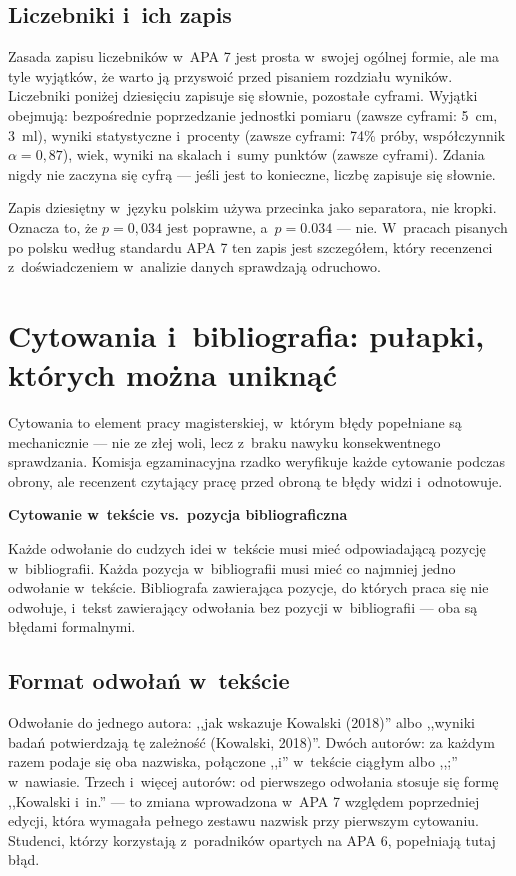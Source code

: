 \documentclass[12pt,a4paper,twoside,openany]{book}
\let\bforigsection\section
\renewcommand{\section}{\needspace{4\baselineskip}\bforigsection}
\newcommand{\concept}[2]{%
  \par\vspace{6pt}
  \begin{tcolorbox}[enhanced, breakable, colback=accent!6, colframe=accent,
    boxrule=0pt, leftrule=3.5pt, arc=2pt, drop fuzzy shadow={black!15},
    left=10pt, right=10pt, top=7pt, bottom=7pt, before upper={\parindent0pt}]
    {\sffamily\bfseries\color{accent}#1}\par\vspace{2pt}\small #2
  \end{tcolorbox}\par
}
\begin{document}
\subsection{Liczebniki i~ich zapis}

Zasada zapisu liczebników w~APA 7 jest prosta w~swojej ogólnej formie, ale ma tyle wyjątków, że warto ją przyswoić przed pisaniem rozdziału wyników. Liczebniki poniżej dziesięciu zapisuje się słownie, pozostałe cyframi. Wyjątki obejmują: bezpośrednie poprzedzanie jednostki pomiaru (zawsze cyframi: 5~cm, 3~ml), wyniki statystyczne i~procenty (zawsze cyframi: 74\% próby, współczynnik $\alpha = 0{,}87$), wiek, wyniki na skalach i~sumy punktów (zawsze cyframi). Zdania nigdy nie zaczyna się cyfrą --- jeśli jest to konieczne, liczbę zapisuje się słownie.

Zapis dziesiętny w~języku polskim używa przecinka jako separatora, nie kropki. Oznacza to, że \mbox{$p = 0{,}034$} jest poprawne, a~$p = 0.034$ --- nie. W~pracach pisanych po polsku według standardu APA 7 ten zapis jest szczegółem, który recenzenci z~doświadczeniem w~analizie danych sprawdzają odruchowo.

\section{Cytowania i~bibliografia: pułapki, których można uniknąć}

Cytowania to element pracy magisterskiej, w~którym błędy popełniane są mechanicznie --- nie ze złej woli, lecz z~braku nawyku konsekwentnego sprawdzania. Komisja egzaminacyjna rzadko weryfikuje każde cytowanie podczas obrony, ale recenzent czytający pracę przed obroną te błędy widzi i~odnotowuje.

\concept{Cytowanie w~tekście vs.\ pozycja bibliograficzna}{Każde odwołanie do cudzych idei w~tekście musi mieć odpowiadającą pozycję w~bibliografii. Każda pozycja w~bibliografii musi mieć co najmniej jedno odwołanie w~tekście. Bibliografa zawierająca pozycje, do których praca się nie odwołuje, i~tekst zawierający odwołania bez pozycji w~bibliografii --- oba są błędami formalnymi.}

\subsection{Format odwołań w~tekście}

Odwołanie do jednego autora: ,,jak wskazuje Kowalski (2018)'' albo ,,wyniki badań potwierdzają tę zależność (Kowalski, 2018)''. Dwóch autorów: za każdym razem podaje się oba nazwiska, połączone ,,i'' w~tekście ciągłym albo ,,;'' w~nawiasie. Trzech i~więcej autorów: od pierwszego odwołania stosuje się formę ,,Kowalski i~in.'' --- to zmiana wprowadzona w~APA 7 względem poprzedniej edycji, która wymagała pełnego zestawu nazwisk przy pierwszym cytowaniu. Studenci, którzy korzystają z~poradników opartych na APA 6, popełniają tutaj błąd.
\end{document}
